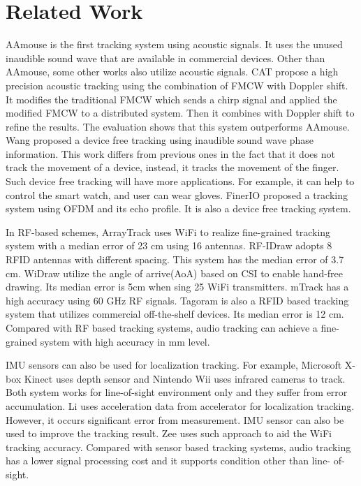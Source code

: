 \documentclass{acm_proc_article-sp}
\begin{document}
\section{Related Work} \label{related_work}
AAmouse is the first tracking system using acoustic signals. It uses
the unused inaudible sound wave that are available in commercial 
devices.
Other
than AAmouse, some other works also utilize acoustic signals. 
CAT \cite{Mao:2016:HAM:2973750.2985617} propose a high precision acoustic tracking using the combination of FMCW with Doppler shift.
It modifies the traditional FMCW which sends a chirp signal and 
applied the modified FMCW to a distributed system. Then it combines 
with Doppler shift to refine the results. The evaluation shows that
this system outperforms AAmouse.
Wang \cite{Wang:2016:DGT:2973750.2973764}
proposed a device free tracking using inaudible sound wave phase 
information. This work differs from previous ones in the fact that it
does not track the movement of a device, instead, it tracks the
movement of the finger. Such device free tracking will have more
applications. For example, it can help to control the smart watch,
and user can wear gloves.
FinerIO 
\cite{Nandakumar:2016:FUA:2858036.2858580} proposed a tracking system
using OFDM and its echo profile. It is also a device free 
tracking system.

In RF-based schemes, ArrayTrack \cite{Xiong:2013:AFI:2482626.2482635}
uses WiFi to realize fine-grained tracking system with a median error of 23 cm using 16 antennas. RF-IDraw 
\cite{Vasisht:2014:RVT:2645884.2645889} 
adopts 8 RFID antennas with different spacing. This system has the
median error of 3.7 cm. WiDraw \cite{Sun:2015:WEH:2789168.2790129}
utilize the angle of arrive(AoA) based on CSI to enable hand-free
drawing. Its median error is 5cm when sing 25 WiFi transmitters.
mTrack \cite{Wei:2015:MHP:2789168.2790113}
has a high accuracy using 60 GHz RF signals.
Tagoram \cite{Yang:2014:TRT:2639108.2639111} 
is also a RFID based tracking system that utilizes
commercial off-the-shelf devices. Its median error is 12 cm.
Compared with RF based tracking systems, audio tracking can achieve
a fine-grained system with high accuracy in mm level.

IMU sensors can also be used for localization tracking. 
For example,
Microsoft X-box Kinect
uses depth sensor and
Nintendo Wii 
uses infrared cameras to track. Both system works for line-of-sight
environment only and they suffer from error accumulation. 
Li \cite{Li:2012:RAI:2370216.2370280}
uses acceleration data from accelerator for localization
tracking. However, it occurs significant error from measurement.
IMU sensor can also be used to improve the tracking result.
Zee \cite{Rai:2012:ZZC:2348543.2348580}
uses such approach to aid the WiFi tracking accuracy. 
Compared
with sensor based tracking systems, audio tracking has a lower 
signal processing cost and it supports condition other than line-
of-sight. 
\end{document}

